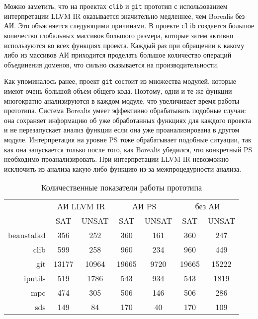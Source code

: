 Можно заметить, что на проектах \texttt{clib} и \texttt{git} прототип с 
использованием интерпретации LLVM IR оказывается значительно медленнее, чем
Borealis без АИ. Это объясняется следующими причинами. В проекте \texttt{clib}
создается большое количество глобальных массивов большого размера, которые
затем активно используются во всех функциях проекта. Каждый раз при обращении
к какому либо из массивов АИ приходится проделать большое количество операций
объединения доменов, что сильно сказывается на производительности.

Как упоминалось ранее, проект \texttt{git} состоит из множества модулей, 
которые имеют очень большой объем общего кода. Поэтому, одни и те же функции
многократно анализируются в каждом модуле, что увеличивает время работы 
прототипа. Система Borealis умеет эффективно обрабатывать подобные случаи: она
сохраняет информацию об уже обработанных функциях для каждого проекта и не 
перезапускает анализ функции если она уже проанализирована в другом модуле. 
Интерпретация на уровне PS тоже обрабатывает подобные ситуации, так как она
запускается только после того, как Borealis убедился, что конкретный PS 
необходимо проанализировать. При интерпретации LLVM IR невозможно исключить
из анализа какую-либо функцию из-за межпроцедурности анализа.

\begin{table}
\caption{Количественные показатели работы прототипа}
\centering
\begin{tabular}{|r|c|c|c|c|c|c|}
\hline
            \multirow{2}{*}{}
           & \multicolumn{2}{c|}{АИ LLVM IR} 
           & \multicolumn{2}{c|}{АИ PS} 
           & \multicolumn{2}{c|}{без АИ} \\ \cline{2-7}
           & SAT    & UNSAT   & SAT    & UNSAT   & SAT    & UNSAT   \\ \hline
beanstalkd & 356    & 252     & 360    & 161     & 360    & 247     \\ \hline
clib       & 599    & 258     & 960    & 234     & 960    & 449     \\ \hline
git        & 13177  & 10964   & 19665  & 9720    & 19665  & 15222   \\ \hline
iputils    & 519    & 1786    & 543    & 934     & 543    & 1819    \\ \hline
mpc        & 474    & 305     & 506    & 146     & 506    & 286     \\ \hline
sds        & 149    & 84      & 170    & 40      & 170    & 109     \\ \hline
\end{tabular}
\label{table:checkResults}
\end{table}

